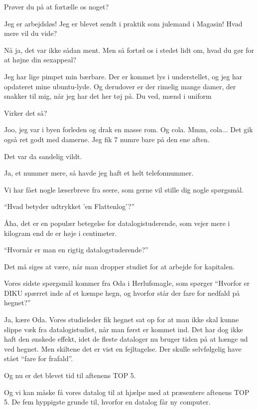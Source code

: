 \documentclass[a4paper,11pt]{article}
\begin{document}
\begin{sketch}
 Prøver du på at fortælle os noget?

  Jeg er arbejdsløs! Jeg er blevet sendt i praktik som julemand i Magasin! Hvad mere vil du vide?

 Nå ja, det var ikke sådan ment. Men så fortæl os i stedet lidt om, hvad du gør for at højne din sexappeal?

 Jeg har lige pimpet min bærbare. Der er kommet lys i understellet, og jeg har opdateret mine ubuntu-lyde. Og derudover er der rimelig mange damer, der snakker til mig, når jeg har det her tøj på. Du ved, mænd i uniform 

 Virker det så?

 Joo, jeg var i byen forleden og drak en masse rom. Og cola. Mmm, cola... Det gik også ret godt med damerne. Jeg fik 7 numre bare på den ene aften.

 Det var da sandelig vildt.

 Ja, et nummer mere, så havde jeg haft et helt telefonnummer.

 Vi har fået nogle læserbreve fra seere, som gerne vil stille dig nogle spørgsmål.

 ``Hvad betyder udtrykket 'en Flattenlog'?''

 Åha, det er en populær betegelse for datalogistuderende, som vejer mere i kilogram end de er høje i centimeter.

 ``Hvornår er man en rigtig datalogstuderende?''

 Det må siges at være, når man dropper studiet for at arbejde for kapitalen.

 Vores sidste spørgsmål kommer fra Oda i Herlufsmagle, som spørger ``Hvorfor er DIKU spærret inde af et kæmpe hegn, og hvorfor står der fare for nedfald på hegnet?''

 Ja, kære Oda. Vores studieleder fik hegnet sat op for at man ikke skal kunne slippe væk fra datalogistudiet, når man først er kommet ind. Det har dog ikke haft den ønskede effekt, idet de fleste dataloger nu bruger tiden på at hænge ud ved hegnet. Men skiltene det er vist en fejltagelse. Der skulle selvfølgelig have stået ``fare for frafald''.

 Og nu er det blevet tid til aftenens TOP 5.


 Og vi kan måske få vores datalog til at hjælpe med at præsentere aftenens TOP 5.  De fem hyppigste grunde til, hvorfor en datalog får ny computer.


\end{sketch}
\end{document}
